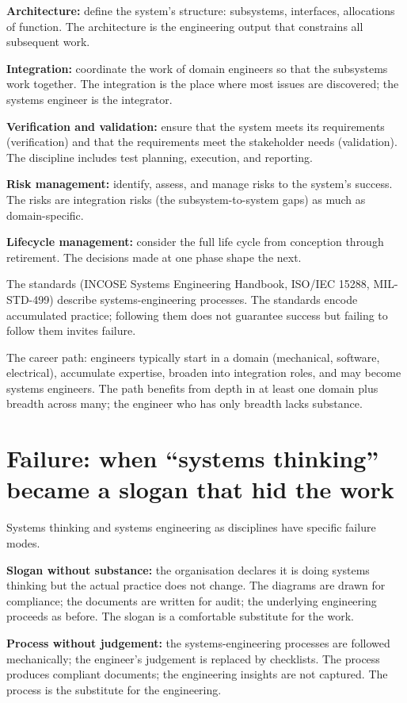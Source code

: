 \textbf{Architecture:} define the system's structure: subsystems, interfaces, allocations of function. The architecture is the engineering output that constrains all subsequent work.

\textbf{Integration:} coordinate the work of domain engineers so that the subsystems work together. The integration is the place where most issues are discovered; the systems engineer is the integrator.

\textbf{Verification and validation:} ensure that the system meets its requirements (verification) and that the requirements meet the stakeholder needs (validation). The discipline includes test planning, execution, and reporting.

\textbf{Risk management:} identify, assess, and manage risks to the system's success. The risks are integration risks (the subsystem-to-system gaps) as much as domain-specific.

\textbf{Lifecycle management:} consider the full life cycle from conception through retirement. The decisions made at one phase shape the next.

The standards (INCOSE Systems Engineering Handbook, ISO/IEC 15288, MIL-STD-499) describe systems-engineering processes. The standards encode accumulated practice; following them does not guarantee success but failing to follow them invites failure.

The career path: engineers typically start in a domain (mechanical, software, electrical), accumulate expertise, broaden into integration roles, and may become systems engineers. The path benefits from depth in at least one domain plus breadth across many; the engineer who has only breadth lacks substance.

\section{Failure: when ``systems thinking'' became a slogan that hid the work}

Systems thinking and systems engineering as disciplines have specific failure modes.

\textbf{Slogan without substance:} the organisation declares it is doing systems thinking but the actual practice does not change. The diagrams are drawn for compliance; the documents are written for audit; the underlying engineering proceeds as before. The slogan is a comfortable substitute for the work.

\textbf{Process without judgement:} the systems-engineering processes are followed mechanically; the engineer's judgement is replaced by checklists. The process produces compliant documents; the engineering insights are not captured. The process is the substitute for the engineering.

